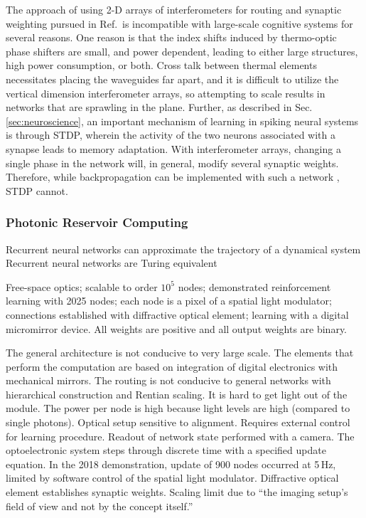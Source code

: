 The approach of using 2-D arrays of interferometers for routing and synaptic weighting pursued in Ref.\,\cite{shha2017} is incompatible with large-scale cognitive systems for several reasons. One reason is that the index shifts induced by thermo-optic phase shifters are small, and power dependent, leading to either large structures, high power consumption, or both. Cross talk between thermal elements necessitates placing the waveguides far apart, and it is difficult to utilize the vertical dimension interferometer arrays, so attempting to scale results in networks that are sprawling in the plane. Further, as described in Sec.\,\ref{sec:neuroscience}, an important mechanism of learning in spiking neural systems is through STDP, wherein the activity of the two neurons associated with a synapse leads to memory adaptation. With interferometer arrays, changing a single phase in the network will, in general, modify several synaptic weights. Therefore, while backpropagation can be implemented with such a network \cite{humi2018}, STDP cannot. 

\subsubsection{Photonic Reservoir Computing}

\vspace{3em}
Recurrent neural networks can approximate the trajectory of a dynamical system \cite{funa1993}
Recurrent neural networks are Turing equivalent \cite{kisi1996}

\vspace{3em}
\cite{jaha2004}

\vspace{3em}
\cite{buma2018}
Free-space optics; scalable to order $10^5$ nodes; demonstrated reinforcement learning with 2025 nodes; each node is a pixel of a spatial light modulator; connections established with diffractive optical element; learning with a digital micromirror device. All weights are positive and all output weights are binary.

The general architecture is not conducive to very large scale. The elements that perform the computation are based on integration of digital electronics with mechanical mirrors. The routing is not conducive to general networks with hierarchical construction and Rentian scaling. It is hard to get light out of the module. The power per node is high because light levels are high (compared to single photons). Optical setup sensitive to alignment. Requires external control for learning procedure. Readout of network state performed with a camera. The optoelectronic system steps through discrete time with a specified update equation. In the 2018 demonstration, update of 900 nodes occurred at 5\,Hz, limited by software control of the spatial light modulator. Diffractive optical element establishes synaptic weights. Scaling limit due to ``the imaging setup's field of view and not by the concept itself.''

